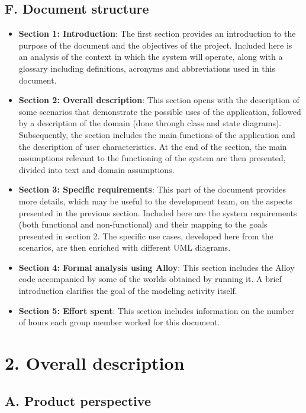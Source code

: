 \section{F. Document structure}

\begin{itemize}
\item
  \textbf{Section 1: Introduction}: The first section provides an
  introduction to the purpose of the document and the objectives of the project. Included here is an analysis of the context in which the system will operate, along with a glossary including definitions, acronyms and abbreviations used in this document.
\item
  \textbf{Section 2: Overall description}: This section opens with the description of some scenarios that demonstrate the possible uses of the application, followed by a description of the domain (done through class and state diagrams). Subsequently, the section includes the main functions of the application and the description of user characteristics. At the end of the section, the main assumptions relevant to the functioning of the system are then presented, divided into text and domain assumptions.
\item
  \textbf{Section 3: Specific requirements}: This part of the document provides more details, which may be useful to the development team, on the aspects presented in the previous section. Included here are the system requirements (both functional and non-functional) and their mapping to the goals presented in section 2. The specific use cases, developed here from the scenarios, are then enriched with different UML diagrams.
\item
  \textbf{Section 4: Formal analysis using Alloy}: This section includes the Alloy code accompanied by some of the worlds obtained by running it. A brief introduction clarifies the goal of the modeling activity itself.
\item
  \textbf{Section 5: Effort spent}: This section includes information on the number of hours each group member worked for this document.
\end{itemize}

\chapter{2. Overall description}

\section{A. Product perspective}

